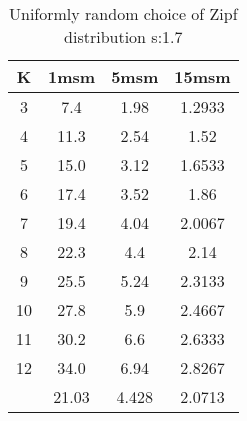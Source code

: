 \begin{table}[H]
\centering
\begin{tabular}{c|ccc}
K &1msm &5msm &15msm\\
\hline
3 & 7.4 & 1.98 & 1.2933\\
4 & 11.3 & 2.54 & 1.52\\
5 & 15.0 & 3.12 & 1.6533\\
6 & 17.4 & 3.52 & 1.86\\
7 & 19.4 & 4.04 & 2.0067\\
8 & 22.3 & 4.4 & 2.14\\
9 & 25.5 & 5.24 & 2.3133\\
10 & 27.8 & 5.9 & 2.4667\\
11 & 30.2 & 6.6 & 2.6333\\
12 & 34.0 & 6.94 & 2.8267\\
\hline
& 21.03 & 4.428 & 2.0713\\
\end{tabular}
\caption{Uniformly random choice of Zipf distribution s:1.7}
\label{tab:s1.7}
\end{table}
